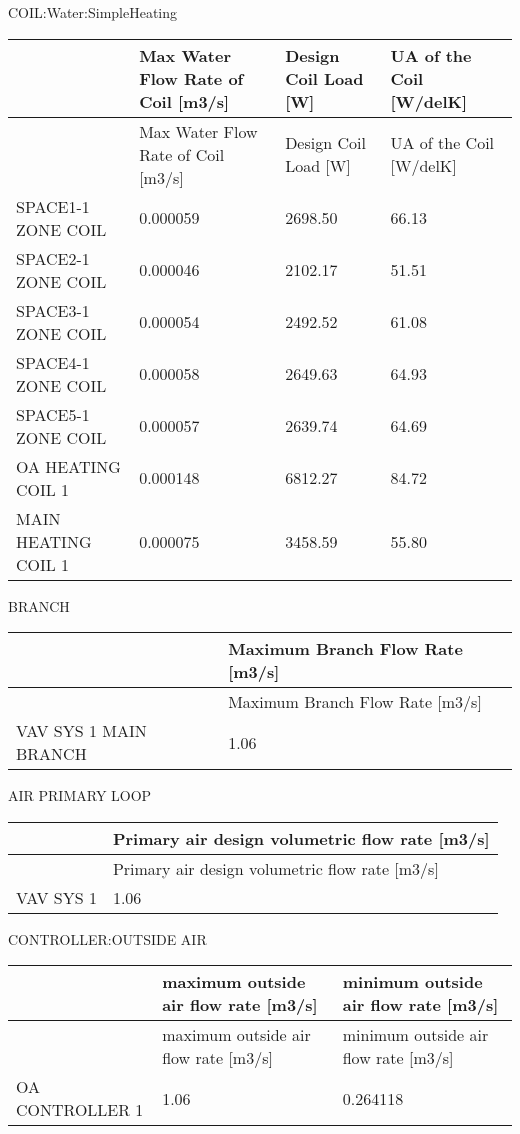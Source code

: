 COIL:Water:SimpleHeating

\begin{longtable}[c]{>{\raggedright}p{1.5in}>{\raggedright}p{1.5in}>{\raggedright}p{1.5in}>{\raggedright}p{1.5in}}
\toprule 
~ & Max Water Flow Rate of Coil [m3/s] & Design Coil Load [W] & UA of the Coil [W/delK] \tabularnewline
\midrule
\endfirsthead

\toprule 
~ & Max Water Flow Rate of Coil [m3/s] & Design Coil Load [W] & UA of the Coil [W/delK] \tabularnewline
\midrule
\endhead

SPACE1-1 ZONE COIL & 0.000059 & 2698.50 & 66.13 \tabularnewline
SPACE2-1 ZONE COIL & 0.000046 & 2102.17 & 51.51 \tabularnewline
SPACE3-1 ZONE COIL & 0.000054 & 2492.52 & 61.08 \tabularnewline
SPACE4-1 ZONE COIL & 0.000058 & 2649.63 & 64.93 \tabularnewline
SPACE5-1 ZONE COIL & 0.000057 & 2639.74 & 64.69 \tabularnewline
OA HEATING COIL 1 & 0.000148 & 6812.27 & 84.72 \tabularnewline
MAIN HEATING COIL 1 & 0.000075 & 3458.59 & 55.80 \tabularnewline
\bottomrule
\end{longtable}

BRANCH

\begin{longtable}[c]{@{}ll@{}}
\toprule 
~ & Maximum Branch Flow Rate [m3/s] \tabularnewline
\midrule
\endfirsthead

\toprule 
~ & Maximum Branch Flow Rate [m3/s] \tabularnewline
\midrule
\endhead

VAV SYS 1 MAIN BRANCH & 1.06 \tabularnewline
\bottomrule
\end{longtable}

AIR PRIMARY LOOP

\begin{longtable}[c]{@{}ll@{}}
\toprule 
~ & Primary air design volumetric flow rate [m3/s] \tabularnewline
\midrule
\endfirsthead

\toprule 
~ & Primary air design volumetric flow rate [m3/s] \tabularnewline
\midrule
\endhead

VAV SYS 1 & 1.06 \tabularnewline
\bottomrule
\end{longtable}

CONTROLLER:OUTSIDE AIR

\begin{longtable}[c]{>{\raggedright}p{1.5in}>{\raggedright}p{2.25in}>{\raggedright}p{2.25in}}
\toprule 
~ & maximum outside air flow rate [m3/s] & minimum outside air flow rate [m3/s] \tabularnewline
\midrule
\endfirsthead

\toprule 
~ & maximum outside air flow rate [m3/s] & minimum outside air flow rate [m3/s] \tabularnewline
\midrule
\endhead

OA CONTROLLER 1 & 1.06 & 0.264118 \tabularnewline
\bottomrule
\end{longtable}

